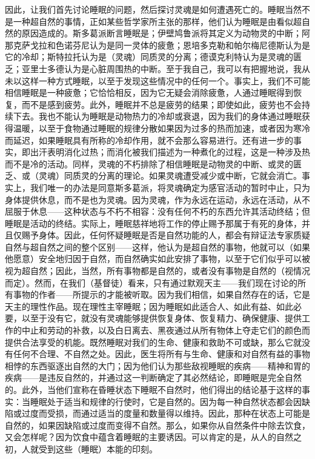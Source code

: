 因此，让我们首先讨论睡眠的问题，然后探讨灵魂是如何遭遇死亡的。睡眠当然不是一种超自然的事情，正如某些哲学家所主张的那样，他们认为睡眠是由看似超自然的原因造成的。斯多葛派断言睡眠是；伊壁鸠鲁派将其定义为动物灵的中断；阿那克萨戈拉和色诺芬尼认为是同一灵体的疲惫；恩培多克勒和帕尔梅尼德斯认为是它的冷却；斯特拉托认为是（灵魂）同质灵的分离；德谟克利特认为是灵魂的匮乏；亚里士多德认为是心脏周围热的中断。至于我自己，我可以有把握地说，我从未以这样一种方式睡眠，以至于发现这些情况中的任何一个。事实上，我们不可能相信睡眠是一种疲惫；它恰恰相反，因为它无疑会消除疲惫，人通过睡眠得到恢复，而不是感到疲劳。此外，睡眠并不总是疲劳的结果；即使如此，疲劳也不会持续下去。我也不能认为睡眠是动物热力的冷却或衰退，因为我们的身体通过睡眠获得温暖，以至于食物通过睡眠的规律分散如果因为过多的热而加速，或者因为寒冷而延迟，如果睡眠具有所称的冷却作用，就不会那么容易进行。还有进一步的事实，即出汗表明消化过热；而消化被我们描述为一种煮化的过程，这是一种涉及热而不是冷的活动。同样，灵魂的不朽排除了相信睡眠是动物灵的中断、或灵的匮乏、或（灵魂）同质灵的分离的理论。如果灵魂遭受减少或中断，它就会消亡。事实上，我们唯一的办法是同意斯多葛派，将灵魂确定为感官活动的暂时中止，只为身体提供休息，而不是也为灵魂。因为灵魂，作为永远在运动，永远在活动，从不屈服于休息——这种状态与不朽不相容：没有任何不朽的东西允许其活动终结；但睡眠是活动的终结。实际上，睡眠慈祥地将工作的停止赐予那属于有死的身体，并且仅赐予身体。因此，任何怀疑睡眠是否是自然功能的人，都会有辩证法专家质疑自然与超自然之间的整个区别——这样，他认为是超自然的事物，他就可以（如果他愿意）安全地归因于自然，而自然确实如此安排了事物，以至于它们似乎可以被视为超自然；因此，当然，所有事物都是自然的，或者没有事物是自然的（视情况而定）。然而，在我们（基督徒）看来，只有通过默观天主——我们现在讨论的所有事物的作者——所提示的才能被听取。因为我们相信，如果自然存在的话，它是天主的理性作品。现在理性主宰睡眠；因为睡眠如此适合人、如此有益、如此必要，以至于没有它，就没有灵魂能够提供恢复身体、恢复精力、确保健康、提供工作的中止和劳动的补救，以及白日离去、黑夜通过从所有物体上夺走它们的颜色而提供合法享受的机能。既然睡眠对我们的生命、健康和救助不可或缺，那么它就没有任何不合理、不自然之处。因此，医生将所有与生命、健康和对自然有益的事物相悖的东西驱逐出自然的大门；因为他们认为那些敌视睡眠的疾病——精神和胃的疾病——是违反自然的，并通过这一判断确定了其必然结论，即睡眠是完全自然的。此外，当他们宣称在昏睡状态下睡眠不自然时，他们得出的结论基于这样的事实：当睡眠处于适当和规律的行使时，它是自然的。因为每一种自然状态都会因缺陷或过度而受损，而通过适当的度量和数量得以维持。因此，那种在状态上可能是自然的，如果因缺陷或过度而变得不自然。那么，如果你从自然条件中除去饮食，又会怎样呢？因为饮食中蕴含着睡眠的主要诱因。可以肯定的是，从人的自然之初，人就受到这些（睡眠）本能的印刻。 